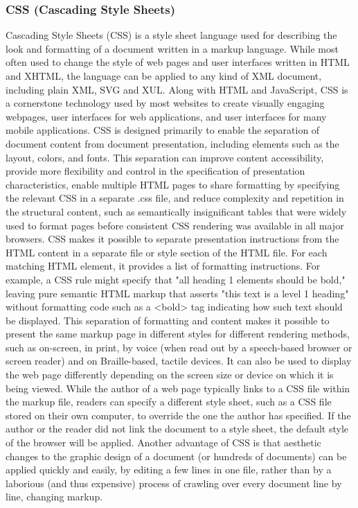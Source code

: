 \subsubsection{CSS (Cascading Style Sheets)}
Cascading Style Sheets (CSS) is a style sheet language used for describing the look and formatting of a document written in a markup language. While most often used to change the style of web pages and user interfaces written in HTML and XHTML, the language can be applied to any kind of XML document, including plain XML, SVG and XUL. Along with HTML and JavaScript, CSS is a cornerstone technology used by most websites to create visually engaging webpages, user interfaces for web applications, and user interfaces for many mobile applications.
CSS is designed primarily to enable the separation of document content from document presentation, including elements such as the layout, colors, and fonts. This separation can improve content accessibility, provide more flexibility and control in the specification of presentation characteristics, enable multiple HTML pages to share formatting by specifying the relevant CSS in a separate .css file, and reduce complexity and repetition in the structural content, such as semantically insignificant tables that were widely used to format pages before consistent CSS rendering was available in all major browsers. CSS makes it possible to separate presentation instructions from the HTML content in a separate file or style section of the HTML file. For each matching HTML element, it provides a list of formatting instructions. For example, a CSS rule might specify that "all heading 1 elements should be bold," leaving pure semantic HTML markup that asserts "this text is a level 1 heading" without formatting code such as a <bold> tag indicating how such text should be displayed.
This separation of formatting and content makes it possible to present the same markup page in different styles for different rendering methods, such as on-screen, in print, by voice (when read out by a speech-based browser or screen reader) and on Braille-based, tactile devices. It can also be used to display the web page differently depending on the screen size or device on which it is being viewed. While the author of a web page typically links to a CSS file within the markup file, readers can specify a different style sheet, such as a CSS file stored on their own computer, to override the one the author has specified. If the author or the reader did not link the document to a style sheet, the default style of the browser will be applied. Another advantage of CSS is that aesthetic changes to the graphic design of a document (or hundreds of documents) can be applied quickly and easily, by editing a few lines in one file, rather than by a laborious (and thus expensive) process of crawling over every document line by line, changing markup.
